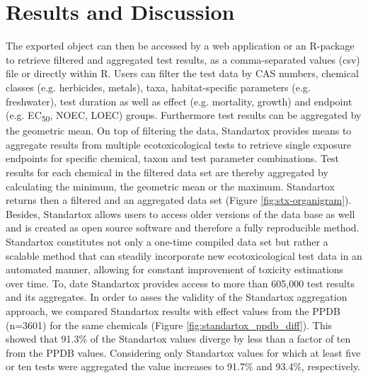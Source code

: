 \documentclass[10pt, a4paper, english]{article}
\begin{document}
\section{Results and Discussion}
The exported object can then be accessed by a web application or an R-package to retrieve filtered and aggregated test results, as a comma-separated values (csv) file or directly within R. Users can filter the test data by CAS numbers, chemical classes (e.g. herbicides, metals), taxa, habitat-specific parameters (e.g. freshwater), test duration as well as effect (e.g. mortality, growth) and endpoint (e.g. EC\textsubscript{50}, NOEC, LOEC) groups. Furthermore test results can be aggregated by the geometric mean. On top of filtering the data, Standartox provides means to aggregate results from multiple ecotoxicological tests to retrieve single exposure endpoints for specific chemical, taxon and test parameter combinations. Test results for each chemical in the filtered data set are thereby aggregated by calculating the minimum, the geometric mean or the maximum. Standartox returns then a filtered and an aggregated data set (Figure \ref{fig:stx-organigram}). Besides, Standartox allows users to access older versions of the data base as well and is created as open source software and therefore a fully reproducible method. Standartox constitutes not only a one-time compiled data set but rather a scalable method that can steadily incorporate new ecotoxicological test data in an automated manner, allowing for constant improvement of toxicity estimations over time. To, date Standartox provides access to more than 605,000 test results and its aggregates. In order to asses the validity of the Standartox aggregation approach, we compared Standartox results with effect values from the PPDB (n=3601) for the same chemicals (Figure \ref{fig:standartox_ppdb_diff}). This showed that 91.3\% of the Standartox values diverge by less than a factor of ten from the PPDB values. Considering only Standartox values for which at least five or ten tests were aggregated the value increases to 91.7\% and 93.4\%, respectively.
\end{document}
